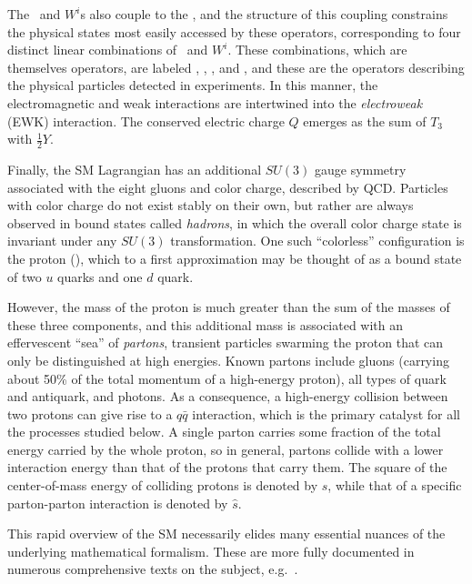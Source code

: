 \documentclass[oneside, letterpaper, 12pt, oldfontcommands]{memoir}
\begin{document}
The \PB\ and $W^{i}$s also couple to the \PH, and the structure of this coupling constrains the physical states
most easily accessed by these operators, corresponding to four distinct linear combinations of
\PB\ and $W^{i}$. These combinations, which are themselves operators, are labeled \PZ, \Pgamma, \PWplus, and \PWminus,
and these are the operators describing the physical particles detected in experiments.
In this manner, the electromagnetic and weak interactions are intertwined into the \textit{electroweak} (EWK) interaction.
The conserved electric charge $Q$ emerges as the sum of $T_{3}$ with $\frac{1}{2}Y$.

Finally, the SM Lagrangian has an additional $SU(3)$ gauge symmetry associated with the eight gluons and color charge, described by QCD.
Particles with color charge do not exist stably on their own, but rather are always observed in bound states called \textit{hadrons}, in which the overall color
charge state is invariant under any $SU(3)$ transformation. One such ``colorless'' configuration is the proton (\Pp), which
to a first approximation may be thought of as a bound state of two $u$ quarks and one $d$ quark.

However, the mass of the proton is much greater than the sum of the masses of these three components, and this additional mass is associated with an effervescent
``sea'' of \textit{partons}, transient particles swarming the proton that can only be distinguished at high energies.
Known partons include gluons (carrying about 50\% of the total momentum of a high-energy proton),
all types of quark and antiquark, and photons. As a consequence, a high-energy collision between two protons can give rise to a $q\bar{q}$ interaction,
which is the primary catalyst for all the processes studied below. A single parton carries some fraction of the total energy carried by the whole proton,
so in general, partons collide with a lower interaction energy than that of the protons that carry them.
The square of the center-of-mass energy of colliding protons is denoted by $s$, while that of a specific
parton-parton interaction is denoted by $\hat{s}$.

This rapid overview of the SM necessarily elides many essential nuances of the underlying mathematical formalism. These are more fully
documented in numerous comprehensive texts on the subject, e.g.~\cite{ref:HalzenMartin, ref:BargerPhillips, ref:PeskinSchroeder, ref:Srednicki, ref:Schwartz}.
\end{document}
